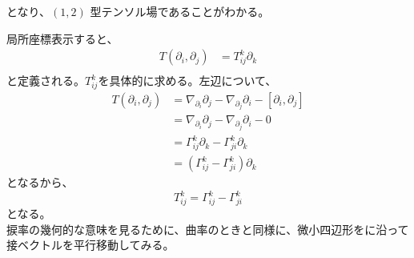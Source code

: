 \documentclass[a4paper,11pt]{jsarticle}
\numberwithin{equation}{section}
\begin{document}
となり、\((1,2)\) 型テンソル場であることがわかる。\hfill\qedsymbol

局所座標表示すると、
\begin{align}
    T(\partial_{i},\partial_{j}) &= T_{ij}^k\partial_{k}\\
\end{align}
と定義される。$T_{ij}^k$を具体的に求める。左辺について、
\begin{align}
    T(\partial_{i},\partial_{j}) &= \nabla_{\partial_{i}}\partial_{j} - \nabla_{\partial_{j}}\partial_{i} - [\partial_{i},\partial_{j}]\\
    &= \nabla_{\partial_{i}}\partial_{j} - \nabla_{\partial_{j}}\partial_{i} - 0\\
    &= \Gamma_{ij}^k\partial_{k} - \Gamma_{ji}^k\partial_{k}\\
    &= (\Gamma_{ij}^k - \Gamma_{ji}^k)\partial_{k}
\end{align}
となるから、
\begin{equation}
    T_{ij}^k = \Gamma_{ij}^k - \Gamma_{ji}^k
\end{equation}
となる。\\
捩率の幾何的な意味を見るために、曲率のときと同様に、微小四辺形をに沿って接ベクトルを平行移動してみる。
\end{document}
